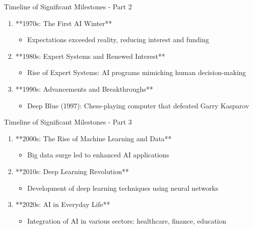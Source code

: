 \documentclass[aspectratio=169]{beamer}
\begin{document}
\begin{frame}[fragile]{Timeline of Significant Milestones - Part 2}
    \begin{enumerate}[resume]
        \item **1970s: The First AI Winter**
            \begin{itemize}
                \item Expectations exceeded reality, reducing interest and funding
            \end{itemize}
        \item **1980s: Expert Systems and Renewed Interest**
            \begin{itemize}
                \item Rise of Expert Systems: AI programs mimicking human decision-making
            \end{itemize}
        \item **1990s: Advancements and Breakthroughs**
            \begin{itemize}
                \item Deep Blue (1997): Chess-playing computer that defeated Garry Kasparov
            \end{itemize}
    \end{enumerate}
\end{frame}

\begin{frame}[fragile]{Timeline of Significant Milestones - Part 3}
    \begin{enumerate}[resume]
        \item **2000s: The Rise of Machine Learning and Data**
            \begin{itemize}
                \item Big data surge led to enhanced AI applications
            \end{itemize}
        \item **2010s: Deep Learning Revolution**
            \begin{itemize}
                \item Development of deep learning techniques using neural networks
            \end{itemize}
        \item **2020s: AI in Everyday Life**
            \begin{itemize}
                \item Integration of AI in various sectors: healthcare, finance, education
            \end{itemize}
    \end{enumerate}
\end{frame}
\end{document}
